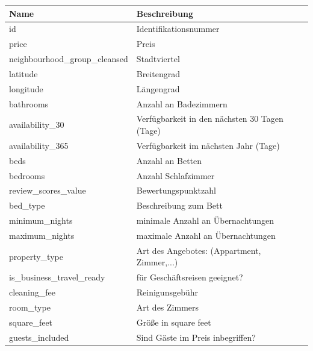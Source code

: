 \documentclass[
]{book}
\begin{document}
\begin{tabular}{ll}
\toprule
                        \textbf{Name} &                 \textbf{Beschreibung} \\
\midrule
                           id &                        Identifikationsnummer \\
                        price &                                        Preis \\
 neighbourhood\_group\_cleansed &                                 Stadtviertel \\
                     latitude &                                  Breitengrad \\
                    longitude &                                   Längengrad \\
                    bathrooms &                        Anzahl an Badezimmern \\
              availability\_30 &       Verfügbarkeit in den nächsten 30 Tagen (Tage) \\
             availability\_365 &               Verfügbarkeit im nächsten Jahr (Tage) \\
                         beds &                             Anzahl an Betten \\
                     bedrooms &                          Anzahl Schlafzimmer \\
          review\_scores\_value &                          Bewertungspunktzahl \\
                     bed\_type &                        Beschreibung zum Bett \\
               minimum\_nights &            minimale Anzahl an Übernachtungen \\
               maximum\_nights &            maximale Anzahl an Übernachtungen \\
                property\_type &  Art des Angebotes: (Appartment, Zimmer,...) \\
     is\_business\_travel\_ready &                für Geschäftsreisen geeignet? \\
                 cleaning\_fee &                              Reinigunsgebühr \\
                    room\_type &                              Art des Zimmers \\
                  square\_feet &                         Größe in square feet \\
              guests\_included &             Sind Gäste im Preis inbegriffen? \\
\bottomrule
\end{tabular}

  
\end{document}
